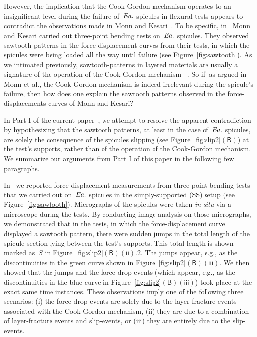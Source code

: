 \documentclass[preprint,10pt,times]{elsarticle}
\makeatletter
\numberwithin{equation}{section}
\newcommand{\pr}[1]{\left( #1 \right)}
\newcommand{\EA}{\textit{Ea.\@}\xspace}
\newcommand{\subf}[1]{\pr{\textsf{#1}}}
\makeatother
\begin{document}
\medskip{}

However, the implication that the Cook-Gordon mechanism operates to
an insignificant level during the failure of~$\EA$ spicules in flexural
tests appears to contradict the observations made in Monn and Kesari~\cite{sarikaya2001biomimetic,levi1989remarkably,monn2017enhanced}.
To be specific, in~\cite{monn2017enhanced} Monn and Kesari carried
out three-point bending tests on~$\EA$ spicules. They observed sawtooth
patterns in the force-displacement curves from their tests, in which
the spicules were being loaded all the way until failure (see Figure~\ref{fig:sawtooth}).
As we intimated previously, sawtooth-patterns in layered materials
are usually a signature of the operation of the Cook-Gordon mechanism~\cite{clegg1990simple}
. So if, as argued in Monn et al., the Cook-Gordon mechanism is indeed
irrelevant during the spicule's failure, then how does one explain
the sawtooth patterns observed in the force-displacements curves of
Monn and Kesari?

In Part I of the current paper~\cite{Sayaka2021Sawtooth}, we attempt
to resolve the apparent contradiction by hypothesizing that the sawtooth
patterns, at least in the case of~$\EA$ spicules, are solely the
consequence of the spicules slipping (see Figure~\ref{fig:slip2}$\subf{B}$)
at the test's supports, rather than of the operation of the Cook-Gordon
mechanism. We summarize our arguments from Part I of this paper in
the following few paragraphs.

\medskip{}

In~\cite{Sayaka2021Sawtooth} we reported force-displacement measurements
from three-point bending tests that we carried out on~$\EA$ spicules
in the simply-supported (SS) setup (see Figure~\ref{fig:sawtooth}).
Micrographs of the spicules were taken\textit{ in-situ} via a microscope
during the tests. By conducting image analysis on those micrographs,
we demonstrated that in the tests, in which the force-displacement
curve displayed a sawtooth pattern, there were sudden jumps in the
total length of the spicule section lying between the test's supports.
This total length is shown marked as~$S$ in Figure~\ref{fig:slip2}$\subf{B}$$\subf{ii}.2$.
The jumps appear, e.g., as the discontinuities in the green curve
shown in Figure~\ref{fig:slip2}$\subf{B}$$\subf{iii}$. We then
showed that the jumps and the force-drop events (which appear, e.g.,
as the discontinuities in the blue curve in Figure~\ref{fig:slip2}$\subf{B}$$\subf{iii}$)
took place at the exact same time instances. These observations imply
one of the following three scenarios: (i) the force-drop events are
solely due to the layer-fracture events associated with the Cook-Gordon
mechanism, (ii) they are due to a combination of layer-fracture events
and slip-events, or (iii) they are entirely due to the slip-events.
\end{document}
